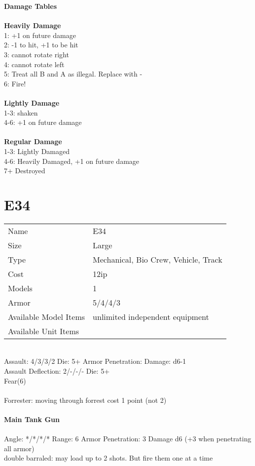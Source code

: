 {\bf Damage Tables} \\
\ \\ {\bf Heavily Damage } \\
1: +1 on future damage \\
2: -1 to hit, +1 to be hit \\
3: cannot rotate right \\
4: cannot rotate left \\
5: Treat all B and A as illegal. Replace with - \\
6: Fire! \\
\ \\ {\bf Lightly Damage } \\
1-3: shaken \\
4-6: +1 on future damage \\
\ \\ {\bf Regular Damage } \\
1-3: Lightly Damaged \\
4-6: Heavily Damaged, +1 on future damage \\
7+ Destroyed \\









\pagebreak

\section{ E34 }

\begin{tabular}{ll}
  Name & E34 \\
  Size & Large\\
  Type & Mechanical, Bio Crew, Vehicle, Track\\
  Cost & 12ip\\
  Models & 1\\
  Armor & 5/4/4/3\\
  Available Model Items & unlimited independent equipment \\
  Available Unit Items &  \\
\end{tabular}

\ \\
Assault: 4/3/3/2 Die: 5+ Armor Penetration:  Damage: d6-1 \\
Assault Deflection: 2/-/-/- Die: 5+\\
\indent Fear(6) \\
\ \\
Forrester: moving through forrest cost 1 point (not 2)
\ \\
\ \\
{\bf Main Tank Gun } \\
\ \\
Angle: */*/*/* Range: 6 Armor Penetration: 3 Damage d6 (+3 when penetrating all armor) \\
\indent double barraled: may load up to 2 shots. But fire them one at a time \\



